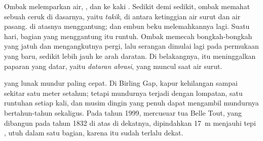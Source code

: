 Ombak melemparkan air, , dan  ke kaki . Sedikit demi
sedikit, ombak memahat sebuah ceruk di dasarnya, yaitu \emph{takik}, di
antara ketinggian air surut dan air pasang.  di atasnya menggantung;
 dan embun beku melemahkannya lagi. Suatu hari, bagian yang
menggantung itu runtuh. Ombak memecah bongkah-bongkah yang jatuh dan
mengangkutnya pergi, lalu serangan dimulai lagi pada permukaan yang baru,
sedikit lebih jauh ke arah daratan. Di belakangnya,  itu
meninggalkan paparan  yang datar, yaitu \emph{dataran
abrasi}, yang muncul saat air surut.

 yang lunak mundur paling cepat. Di Birling Gap,  kapur
kehilangan sampai sekitar satu meter setahun; tetapi mundurnya terjadi
dengan lompatan, satu runtuhan setiap kali, dan musim dingin yang penuh
 dapat mengambil mundurnya bertahun-tahun sekaligus. Pada tahun
1999, mercusuar tua Belle Tout, yang dibangun pada tahun 1832 di atas
 di dekatnya, dipindahkan \qty{17}{m} menjauhi tepi , utuh
dalam satu bagian, karena  itu sudah terlalu dekat.

